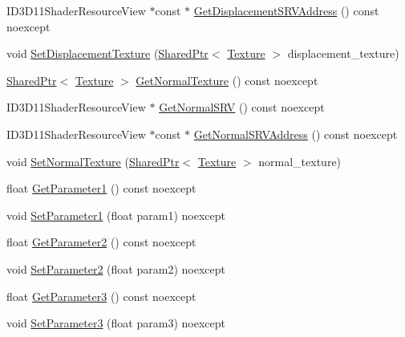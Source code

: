 \begin{DoxyCompactItemize}
\item 
I\+D3\+D11\+Shader\+Resource\+View $\ast$const  $\ast$ \hyperlink{structmage_1_1_shaded_material_afc31aec2b4532b196306db049c3dddf6}{Get\+Displacement\+S\+R\+V\+Address} () const noexcept
\item 
void \hyperlink{structmage_1_1_shaded_material_ab96c9ab7165ebb330790b15460b53c3b}{Set\+Displacement\+Texture} (\hyperlink{namespacemage_a1e01ae66713838a7a67d30e44c67703e}{Shared\+Ptr}$<$ \hyperlink{classmage_1_1_texture}{Texture} $>$ displacement\+\_\+texture)
\item 
\hyperlink{namespacemage_a1e01ae66713838a7a67d30e44c67703e}{Shared\+Ptr}$<$ \hyperlink{classmage_1_1_texture}{Texture} $>$ \hyperlink{structmage_1_1_shaded_material_a879b003bf09d4985c028d134cdbe46eb}{Get\+Normal\+Texture} () const noexcept
\item 
I\+D3\+D11\+Shader\+Resource\+View $\ast$ \hyperlink{structmage_1_1_shaded_material_a5fd4dfbf132fa697fafbbac082ab8bdb}{Get\+Normal\+S\+RV} () const noexcept
\item 
I\+D3\+D11\+Shader\+Resource\+View $\ast$const  $\ast$ \hyperlink{structmage_1_1_shaded_material_a2b506a6d1ec48be536cb3318349bb2da}{Get\+Normal\+S\+R\+V\+Address} () const noexcept
\item 
void \hyperlink{structmage_1_1_shaded_material_a681531e5a979ebdc4a0e8933a2439c0f}{Set\+Normal\+Texture} (\hyperlink{namespacemage_a1e01ae66713838a7a67d30e44c67703e}{Shared\+Ptr}$<$ \hyperlink{classmage_1_1_texture}{Texture} $>$ normal\+\_\+texture)
\item 
float \hyperlink{structmage_1_1_shaded_material_a896c5cc584d24d420b8fe7939905633d}{Get\+Parameter1} () const noexcept
\item 
void \hyperlink{structmage_1_1_shaded_material_a16cc73293d4e18f3945e4a5818041ea7}{Set\+Parameter1} (float param1) noexcept
\item 
float \hyperlink{structmage_1_1_shaded_material_aad19a7947f7904fa204092c7df945a9b}{Get\+Parameter2} () const noexcept
\item 
void \hyperlink{structmage_1_1_shaded_material_a2b32f69b11604f20bf63653eed0f93b0}{Set\+Parameter2} (float param2) noexcept
\item 
float \hyperlink{structmage_1_1_shaded_material_a9af9a519df49114dc516b7f5057b1f4f}{Get\+Parameter3} () const noexcept
\item 
void \hyperlink{structmage_1_1_shaded_material_aa03eb95e8375fa28c05a837c7e5195b5}{Set\+Parameter3} (float param3) noexcept
\item 

\end{DoxyCompactItemize}
